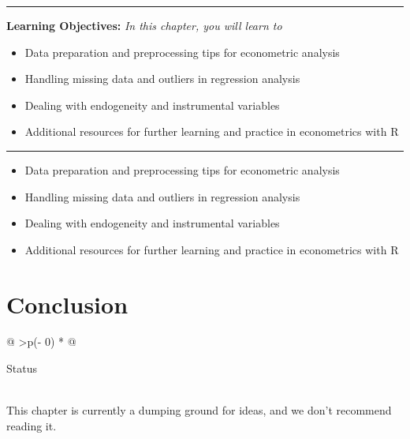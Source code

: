 \documentclass[
  letterpaper,
  paper =a4,
  twoside,
  openright,
  headsepline,
  footsepline,
  listof = totocnumbered,
  chapterprefix = true,
  firstiscover]{scrbook}
\providecommand{\abstractname}{Learning Objectives} %
\newenvironment{objectives}[1]{%
	\hrule
	\vspace{5pt}
	\small\textbf{\abstractname: } 
	\newline
	\vspace{0.1cm}
	\small\emph{#1} %
	\itshape %
}{%
	\vspace{5pt}
	\hrule
	\vspace{0.6cm}
}
\begin{document}
\begin{objectives}{In this chapter, you will learn to}
\begin{itemize}

\item{Data preparation and preprocessing tips for econometric analysis}

\item{Handling missing data and outliers in regression analysis}

\item{Dealing with endogeneity and instrumental variables}

\item{Additional resources for further learning and practice in econometrics with R}

\end{itemize}

\end{objectives}

\begin{itemize}
\item
  Data preparation and preprocessing tips for econometric analysis
\item
  Handling missing data and outliers in regression analysis
\item
  Dealing with endogeneity and instrumental variables
\item
  Additional resources for further learning and practice in econometrics
  with R
\end{itemize}


\hypertarget{conclusion}{%
\chapter{Conclusion}\label{conclusion}}

\begin{longtable}[]{@{}
  >{\centering\arraybackslash}p{(\columnwidth - 0\tabcolsep) * }@{}}
\toprule\noalign{}
\begin{minipage}[b]{\linewidth}\centering
Status
\end{minipage} \\
\midrule\noalign{}
\endhead
\bottomrule\noalign{}
\endlastfoot
This chapter is currently a dumping ground for ideas, and we don't
recommend reading it. \\
\end{longtable}
\end{document}
